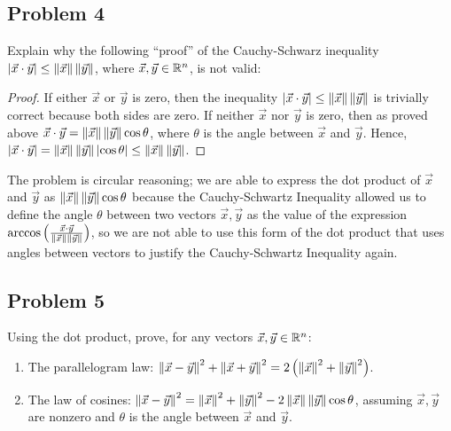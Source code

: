 \documentclass[main.tex]{subfiles}
\begin{document}
\subsection{Problem 4}
\begin{claim}
    Explain why the following “proof” of the Cauchy-Schwarz inequality $\left\lvert \vec{x}\cdot \vec{y} \right\rvert \le \left\lVert \vec{x} \right\rVert \left\lVert \vec{y} \right\rVert$, where $\vec{x}, \vec{y} \in \mathbb R^n$, is not valid:

    \begin{proof}
        If either $\vec{x}$ or $\vec{y}$ is zero, then the inequality $\left\lvert \vec{x}\cdot \vec{y} \right\rvert \le \left\lVert \vec{x} \right\rVert \left\lVert \vec{y} \right\rVert$ is trivially correct because both sides are zero. If neither $\vec{x}$ nor $\vec{y}$ is zero, then as proved above $\vec{x} \cdot \vec{y} = \left\lVert \vec{x} \right\rVert \left\lVert \vec{y} \right\rVert \cos \theta$, where $\theta$ is the angle between $\vec{x}$ and $\vec{y}$. Hence, $\left\lvert \vec{x}\cdot \vec{y} \right\rvert = \left\lVert \vec{x} \right\rVert \left\lVert \vec{y} \right\rVert \left\lvert \cos \theta \right\rvert \le \left\lVert \vec{x} \right\rVert \left\lVert \vec{y} \right\rVert$.
    \end{proof}
\end{claim}

\begin{soln}
    The problem is circular reasoning; we are able to express the dot product of $\vec{x}$ and $\vec{y}$ as $\left\lVert \vec{x} \right\rVert \left\lVert \vec{y} \right\rVert \cos \theta$ because the Cauchy-Schwartz Inequality allowed us to define the angle $\theta$ between two vectors $\vec{x}, \vec{y}$ as the value of the expression $\arccos\left( \frac{\vec{x}\cdot \vec{y}}{\left\lVert \vec{x} \right\rVert \left\lVert \vec{y} \right\rVert} \right)$, so we are not able to use this form of the dot product that uses angles between vectors to justify the Cauchy-Schwartz Inequality again.
\end{soln}
\eject

\subsection{Problem 5}
\begin{claim}
    Using the dot product, prove, for any vectors $\vec{x}, \vec{y} \in \mathbb R^n$:
    \begin{enumerate}[label=(\alph*)]
        \item The parallelogram law: $\left\lVert \vec{x} - \vec{y} \right\rVert^2 + \left\lVert \vec{x} + \vec{y} \right\rVert^2 = 2\left( \left\lVert \vec{x} \right\rVert^2 + \left\lVert \vec{y} \right\rVert^2 \right)$.
        \item The law of cosines: $\left\lVert \vec{x} - \vec{y} \right\rVert^2 = \left\lVert \vec{x} \right\rVert^2 + \left\lVert \vec{y} \right\rVert^2 - 2\left\lVert \vec{x} \right\rVert \left\lVert \vec{y} \right\rVert \cos\theta$, assuming $\vec{x}, \vec{y}$ are nonzero and $\theta$ is the angle between $\vec{x}$ and $\vec{y}$.
    \end{enumerate}
\end{claim}
\end{document}
